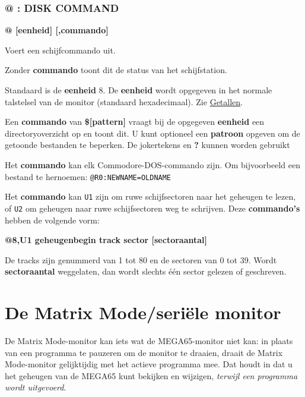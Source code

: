 \subsubsection{@ : DISK COMMAND}
\begin{description}[leftmargin=2cm,style=nextline]
\item [Formaat:] {\bf @ [eenheid] [,commando]}\item [Gebruik:] Voert een schijfcommando uit.

\item [Opmerkingen:] Zonder {\bf commando} toont dit de status van het schijfstation.

    Standaard is de {\bf eenheid} 8. De {\bf eenheid} wordt opgegeven in het normale talstelsel van de monitor (standaard hexadecimaal). Zie \hyperref[sec:numbers]{Getallen}.

    Een {\bf commando} van {\bf \$[pattern]} vraagt bij de opgegeven {\bf eenheid} een directoryoverzicht op en toont dit. U kunt optioneel een {\bf patroon} opgeven om de getoonde bestanden te beperken. De jokertekens {\bf *} en {\bf ?} kunnen worden gebruikt

    Het {\bf commando} kan elk Commodore-DOS-commando zijn. Om bijvoorbeeld een bestand te hernoemen: {\tt @R0:NEWNAME=OLDNAME}

    Het {\bf commando} kan {\tt U1} zijn om ruwe schijfsectoren naar het geheugen te lezen, of {\tt U2} om geheugen naar ruwe schijfsectoren weg te schrijven. Deze {\bf commando's} hebben de volgende vorm:

    {\bf @8,U1 geheugenbegin track sector [sectoraantal]}

    De tracks zijn genummerd van 1 tot 80 en de sectoren van 0 tot 39. Wordt {\bf sectoraantal} weggelaten, dan wordt slechts één sector gelezen of geschreven.

\end{description}



\section{De Matrix Mode/seriële monitor}
\label{sec:matrix-mode}

De Matrix Mode-monitor kan iets wat de MEGA65-monitor niet kan: in plaats van een programma te pauzeren om de monitor te draaien, draait de Matrix Mode-monitor gelijktijdig met het actieve programma mee. Dat houdt in dat u het geheugen van de MEGA65 kunt bekijken en wijzigen, {\em terwijl een programma wordt uitgevoerd}.

